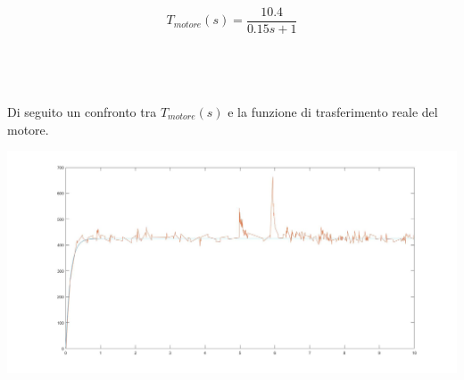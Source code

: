 \\
$$
T_{motore}(s)=\displaystyle\frac{10.4}{0.15s+1}
$$
\\\\\\\\
Di seguito un confronto tra $T_{motore}(s)$ e la funzione di trasferimento reale del motore.
\begin{center}
	\includegraphics[width=\textwidth]{modMotorvsReale.jpg}
\end{center}
